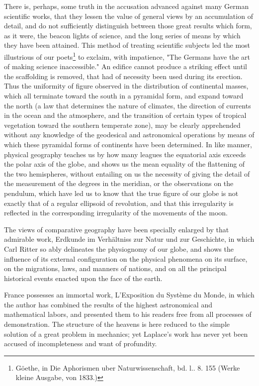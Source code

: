 There is, perhaps, some truth in the accusation advanced against many German scientific works, that they lessen the value of general views by an accumulation of detail, and do not sufficiently distinguish between those great results which form, as it were, the beacon lights of science, and the long series of means by which they have been attained. This method of treating scientific subjects led the most illustrious of our poets\footnote{G\"oethe, in Die Aphorismen uber Naturwissenschaft, bd. l.. 8. 155 (Werke kleine Ausgabe, von 1833.)} to exclaim, with impatience, "The Germans have the art of making science inaccessible." An edifice cannot produce a striking effect until the scaffolding is removed, that had of necessity been used during its erection. Thus the uniformity of figure observed in the distribution of continental masses, which all terminate toward the south in a pyramidal form, and expand toward the north (a law that determines the nature of climates, the direction of currents in the ocean and the atmosphere, and the transition of certain types of tropical vegetation toward the southern temperate zone), may be clearly apprehended without any knowledge of the geodesical and astronomical operations by means of which these pyramidal forms of continents have been determined. In like manner, physical geography teaches us by how many leagues the equatorial axis exceeds the polar axis of the globe, and shows us the mean equality of the flattening of the two hemispheres, without entailing on us the necessity of giving the detail of the measurement of the degrees in the meridian, or the observations on the pendulum, which have led us to know that the true figure of our globe is not exactly that of a regular ellipsoid of revolution, and that this irregularity is reflected in the corresponding irregularity of the movements of the moon.

The views of comparative geography have been specially enlarged by that admirable work, Erdkunde im Verhältniss zur Natur und zur Geschichte, in which Carl Ritter so ably delineates the physiognomy of our globe, and shows the influence of its external configuration on the physical phenomena on its surface, on the migrations, laws, and manners of nations, and on all the principal historical events enacted upon the face of the earth.

France possesses an immortal work, L'Exposition du Système du Monde, in which the author has combined the results of the highest astronomical and mathematical labors, and presented them to his readers free from all processes of demonstration. The structure of the heavens is here reduced to the simple solution of a great problem in mechanics; yet Laplace's work has never yet been accused of incompleteness and want of profundity.

